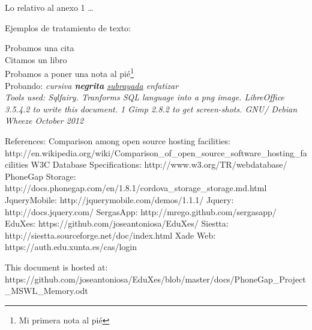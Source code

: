 


Lo relativo al anexo 1 \dots

Ejemplos de tratamiento de texto:

Probamos una cita \cite{NewCam97}\\
Citamos un libro\cite{Pesce}\\
Probamos a poner una nota al pi\'e\footnote{Mi primera nota al pi\'e}\\
Probando: \it{cursiva} \textbf{negrita} \underline{subrayada} \emph{enfatizar}\\


Tools used:
Sqlfairy. Tranforms SQL language into a  png image.
LibreOffice 3.5.4.2 to write this document. 1 
Gimp 2.8.2 to get screen-shots.
GNU/ Debian Wheeze October 2012 

References:
Comparison among open source hosting facilities: http://en.wikipedia.org/wiki/Comparison_of_open_source_software_hosting_facilities
W3C Database Specifications: http://www.w3.org/TR/webdatabase/
PhoneGap Storage:  http://docs.phonegap.com/en/1.8.1/cordova_storage_storage.md.html
JqueryMobile: http://jquerymobile.com/demos/1.1.1/
Jquery: http://docs.jquery.com/
SergasApp: http://mrego.github.com/sergasapp/
EduXes: https://github.com/joseantoniosa/EduXes/
Siestta: http://siestta.sourceforge.net/doc/index.html
Xade Web: https://auth.edu.xunta.es/cas/login 

This document is hosted at:
https://github.com/joseantoniosa/EduXes/blob/master/docs/PhoneGap_Project_MSWL_Memory.odt
